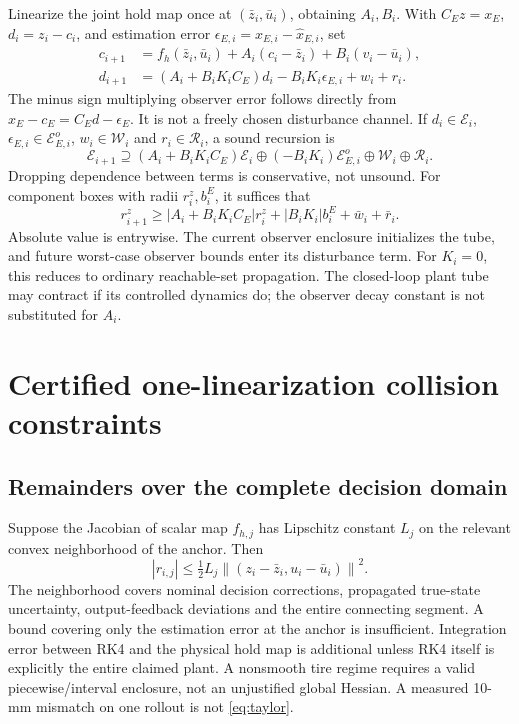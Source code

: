 \documentclass[10pt,letterpaper]{article}
\newcommand{\E}{\mathcal E}
\newcommand{\W}{\mathcal W}
\newcommand{\norm}[1]{\left\lVert#1\right\rVert}
\begin{document}
Linearize the joint hold map once at $(\bar z_i,\bar u_i)$, obtaining $A_i,B_i$.
With $C_Ez=x_E$, $d_i=z_i-c_i$, and estimation error
$\epsilon_{E,i}=x_{E,i}-\hat x_{E,i}$, set
\begin{align}
c_{i+1}&=f_h(\bar z_i,\bar u_i)+A_i(c_i-\bar z_i)+B_i(v_i-\bar u_i),\\
d_{i+1}&=(A_i+B_iK_iC_E)d_i-B_iK_i\epsilon_{E,i}+w_i+r_i.
\label{eq:tubeDynamics}
\end{align}
The minus sign multiplying observer error follows directly from
$\hat x_E-c_E=C_Ed-\epsilon_E$. It is not a freely chosen disturbance channel.
If $d_i\in\E_i$, $\epsilon_{E,i}\in\E^o_{E,i}$, $w_i\in\W_i$ and
$r_i\in\mathcal R_i$, a sound recursion is
\begin{equation}\label{eq:tube}
\E_{i+1}\supseteq(A_i+B_iK_iC_E)\E_i\oplus
(-B_iK_i)\E^o_{E,i}\oplus\W_i\oplus\mathcal R_i.
\end{equation}
Dropping dependence between terms is conservative, not unsound. For component
boxes with radii $r^z_i,b^E_i$, it suffices that
\begin{equation}\label{eq:boxTube}
r^z_{i+1}\ge |A_i+B_iK_iC_E|r^z_i+|B_iK_i|b^E_i+
\bar w_i+\bar r_i.
\end{equation}
Absolute value is entrywise. The current observer enclosure initializes the
tube, and future worst-case observer bounds enter its disturbance term. For
$K_i=0$, this reduces to ordinary reachable-set propagation. The closed-loop
plant tube may contract if its controlled dynamics do; the observer decay
constant is not substituted for $A_i$.

\section{Certified one-linearization collision constraints}
\subsection{Remainders over the complete decision domain}
Suppose the Jacobian of scalar map $f_{h,j}$ has Lipschitz constant $L_j$ on
the relevant convex neighborhood of the anchor. Then
\begin{equation}\label{eq:taylor}
|r_{i,j}|\le\tfrac12L_j
\norm{(z_i-\bar z_i,u_i-\bar u_i)}^2.
\end{equation}
The neighborhood covers nominal decision corrections, propagated true-state
uncertainty, output-feedback deviations and the entire connecting segment.
A bound covering only the estimation error at the anchor is insufficient.
Integration error between RK4 and the physical hold map is additional unless
RK4 itself is explicitly the entire claimed plant. A nonsmooth tire regime
requires a valid piecewise/interval enclosure, not an unjustified global
Hessian. A measured 10-mm mismatch on one rollout is not \eqref{eq:taylor}.
\end{document}

